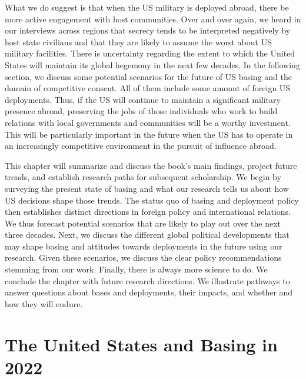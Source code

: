 What we do suggest is that when the US military is deployed abroad, there be more active engagement with host communities. Over and over again, we heard in our interviews across regions that secrecy tends to be interpreted negatively by host state civilians and that they are likely to assume the worst about US military facilities. There is uncertainty regarding the extent to which the United States will maintain its global hegemony in the next few decades. In the following section, we discuss some potential scenarios for the future of US basing and the domain of competitive consent. All of them include some amount of foreign US deployments. Thus, if the US will continue to maintain a significant military presence abroad, preserving the jobs of those individuals who work to build relations with local governments and communities will be a worthy investment. This will be particularly important in the future when the US has to operate in an increasingly competitive environment in the pursuit of influence abroad. 

This chapter will summarize and discuss the book's main findings, project future trends, and establish research paths for subsequent scholarship. We begin by surveying the present state of basing and what our research tells us about how US decisions shape those trends. The status quo of basing and deployment policy then establishes distinct directions in foreign policy and international relations. We thus forecast potential scenarios that are likely to play out over the next three decades. Next, we discuss the different global political developments that may shape basing and attitudes towards deployments in the future using our research. Given these scenarios, we discuss the clear policy recommendations stemming from our work. Finally, there is always more science to do. We conclude the chapter with future research directions. We illustrate pathways to answer questions about bases and deployments, their impacts, and whether and how they will endure. 

\section*{The United States and Basing in 2022}

